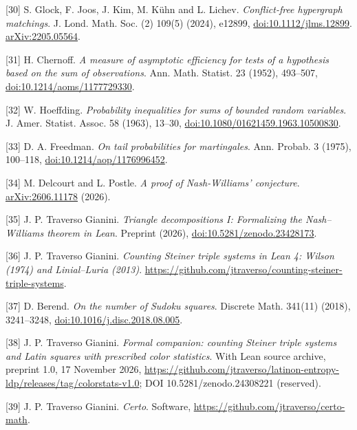 \documentclass[english,11pt,a4paper]{article}
\begin{document}
{[}30{]} S. Glock, F. Joos, J. Kim, M. Kühn and L. Lichev. \emph{Conflict-free hypergraph matchings}. J. Lond. Math. Soc. (2) 109(5) (2024), e12899, \href{https://doi.org/10.1112/jlms.12899}{doi:10.1112/jlms.12899}. \href{https://arxiv.org/abs/2205.05564}{arXiv:2205.05564}.

{[}31{]} H. Chernoff. \emph{A measure of asymptotic efficiency for tests of a hypothesis based on the sum of observations}. Ann. Math. Statist. 23 (1952), 493--507, \href{https://doi.org/10.1214/aoms/1177729330}{doi:10.1214/aoms/1177729330}.

{[}32{]} W. Hoeffding. \emph{Probability inequalities for sums of bounded random variables}. J. Amer. Statist. Assoc. 58 (1963), 13--30, \href{https://doi.org/10.1080/01621459.1963.10500830}{doi:10.1080/01621459.1963.10500830}.

{[}33{]} D. A. Freedman. \emph{On tail probabilities for martingales}. Ann. Probab. 3 (1975), 100--118, \href{https://doi.org/10.1214/aop/1176996452}{doi:10.1214/aop/1176996452}.

{[}34{]} M. Delcourt and L. Postle. \emph{A proof of Nash-Williams' conjecture}. \href{https://arxiv.org/abs/2606.11178}{arXiv:2606.11178} (2026).

{[}35{]} J. P. Traverso Gianini. \emph{Triangle decompositions I: Formalizing the Nash--Williams theorem in Lean}. Preprint (2026), \href{https://doi.org/10.5281/zenodo.23428173}{doi:10.5281/zenodo.23428173}.

{[}36{]} J. P. Traverso Gianini. \emph{Counting Steiner triple systems in Lean 4: Wilson (1974) and Linial--Luria (2013)}. \url{https://github.com/jtraverso/counting-steiner-triple-systems}.

{[}37{]} D. Berend. \emph{On the number of Sudoku squares}. Discrete Math. 341(11) (2018), 3241--3248, \href{https://doi.org/10.1016/j.disc.2018.08.005}{doi:10.1016/j.disc.2018.08.005}.

{[}38{]} J. P. Traverso Gianini. \emph{Formal companion: counting Steiner triple systems and Latin squares with prescribed color statistics}. With Lean source archive, preprint 1.0, 17 November 2026, \url{https://github.com/jtraverso/latinon-entropy-ldp/releases/tag/colorstats-v1.0}; DOI 10.5281/zenodo.24308221 (reserved).

{[}39{]} J. P. Traverso Gianini. \emph{Certo}. Software, \url{https://github.com/jtraverso/certo-math}.

\endgroup
\end{document}
